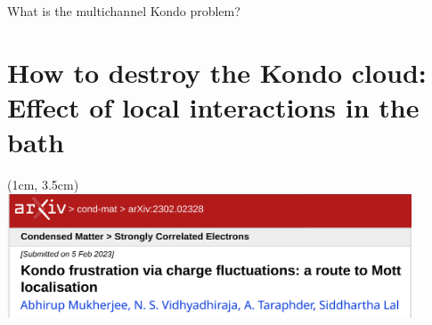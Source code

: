 \documentclass[aspectratio=169]{beamer}
\begin{document}
\begin{frame}{What is the multichannel Kondo problem?}
\end{frame}

\section{How to destroy the Kondo cloud:\\
Effect of local interactions in the bath\vspace*{20pt}}
\begin{textblock*}{\textwidth}(1cm, 3.5cm)
\includegraphics[width=0.9\textwidth]{esiam_arxiv.pdf}\\
\end{textblock*}
\subsection{~}
\end{document}
